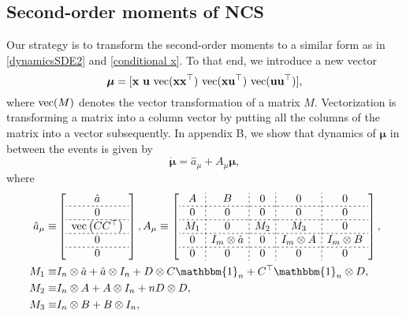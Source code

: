 \documentclass[letterpaper, 10 pt,one column, conference]{ieeeconf}  %
\begin{document}
\subsection{Second-order moments of NCS}
Our strategy is to transform the second-order moments to a similar form as in \eqref{dynamicsSDE2} and \eqref{conditional x}. To that end, we introduce a new vector 
 \begin{equation}\boldsymbol \mu=[\bold x \ \bold u \ {\rm vec}(\bold x \bold x^\top)  \ {\rm vec}(\bold x \bold u^\top)  \ {\rm vec}(\bold u \bold u^\top)  ],\end{equation}
where ${\rm vec}(M)$ denotes the vector transformation of a matrix $M$. Vectorization is transforming a matrix into a column vector by putting all the columns of the matrix into a vector subsequently. In appendix B, we show that dynamics of $\boldsymbol \mu$ in between the events is given by 
 \begin{equation}
\dot{\boldsymbol \mu}= \hat{a}_\mu + A_\mu \boldsymbol \mu , \label{mu dynamic0}
\end{equation}
where
\begin{equation}\label{au}
\begin{aligned}
\hat{a}_\mu\equiv &  \left[\begin{array}{c}
\hat{a}\\ \hdashline[2pt/2pt]0\\ \hdashline[2pt/2pt] \small{ {\rm vec}  \left( CC^\top\right)} \\ \hdashline[2pt/2pt]0\\ \hdashline[2pt/2pt]0
\end{array}\right],  
A_\mu \equiv   \left[\begin{array}{c;{2pt/2pt}c;{2pt/2pt}c;{2pt/2pt}c;{2pt/2pt}c}
	A & B & 0 & 0& 0\\ \hdashline[2pt/2pt]0 & 0 & 0 & 0&0 \\ \hdashline[2pt/2pt] M_1& 0&  M_2&M_3 & 0  \\ \hdashline[2pt/2pt] 0& I_m \otimes \hat{a}&  0&I_m \otimes A & I_m \otimes B \\ \hdashline[2pt/2pt] 0&0&  0&0& 0	\end{array}\right],\\ 
M_1\equiv &I_n \otimes \hat{a} + \hat{a}  \otimes I_n+D \otimes C  \mathbbm{1}_{n}+ C^\top  \mathbbm{1}_{n} \otimes D, \\
M_2 \equiv &I_n \otimes A+  A \otimes I_n +n D\otimes D,     \\ 
M_3 \equiv & I_n \otimes B+  B \otimes I_n,
\end{aligned}
\end{equation}
\end{document}
